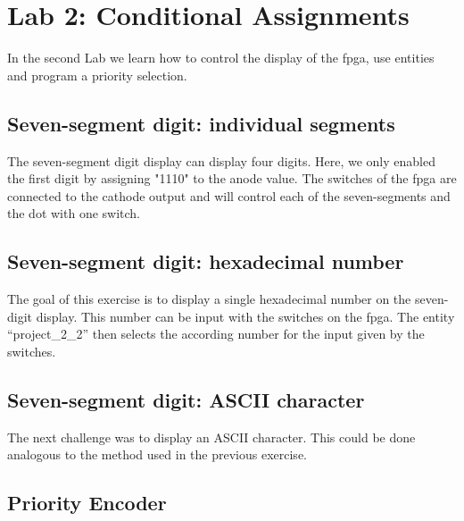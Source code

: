\chapter{Lab 2: Conditional Assignments} \label{day2}

In the second Lab we learn how to control the display of the \gls{fpga}, use entities and program a priority selection.

\section{Seven-segment digit: individual segments}

The seven-segment digit display can display four digits. Here, we only enabled the first digit by assigning "1110" to the anode value. The switches of the \gls{fpga} are connected to the cathode output and will control each of the seven-segments and the dot with one switch. 



\section{Seven-segment digit: hexadecimal number}

The goal of this exercise is to display a single hexadecimal number on the seven-digit display. This number can be input with the switches on the \gls{fpga}. The entity ``project\_2\_2'' then selects the according number for the input given by the switches. 





\section{Seven-segment digit: ASCII character}

The next challenge was to display an ASCII character. This could be done analogous to the method used in the previous exercise.





\section{Priority Encoder}

